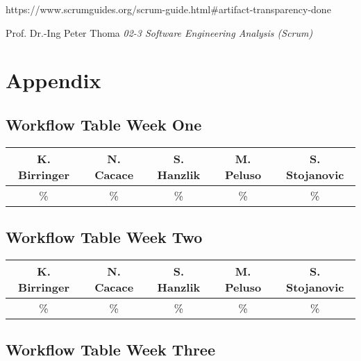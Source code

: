 \documentclass[a4paper, 12pt]{article}
\begin{document}
\newpage    
\begin{thebibliography}{}
https://www.scrumguides.org/scrum-guide.html\#artifact-transparency-done 

 Prof. Dr.-Ing Peter Thoma \emph{02-3 Software Engineering Analysis (Scrum)}

\end{thebibliography}


\newpage
\section{Appendix}
\subsection{Workflow Table Week One}
\begin{table}[h]
\centering
\setlength{\tabcolsep}{12pt}
\begin{tabular}{|c|c|c|c|c|}
\hline
K. Birringer & N. Cacace & S. Hanzlik & M. Peluso & S. Stojanovic\\
\hline
\% & \% & \% & \% & \% \\ 
\hline
\end{tabular}
\end{table}
\subsection{Workflow Table Week Two}
\begin{table}[h]
\centering
\setlength{\tabcolsep}{12pt}
\begin{tabular}{|c|c|c|c|c|}
\hline
K. Birringer & N. Cacace & S. Hanzlik & M. Peluso & S. Stojanovic\\
\hline
\% & \% & \% & \% & \% \\ 
\hline
\end{tabular}
\end{table}
\subsection{Workflow Table Week Three}
\end{document}
